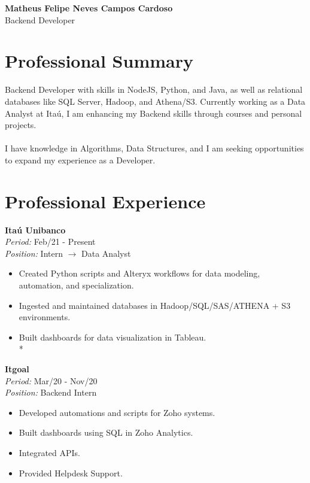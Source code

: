\documentclass[a4paper,10pt]{article}
\begin{document}
\begin{center}
    \textbf{\LARGE Matheus Felipe Neves Campos Cardoso} \\
    Backend Developer 
\end{center}

\begin{minipage}[t]{0.60\textwidth}
    \section*{\faUser \space Professional Summary}
    Backend Developer with skills in NodeJS, Python, and Java, as well as relational databases like SQL Server, Hadoop, and Athena/S3. Currently working as a Data Analyst at Itaú, I am enhancing my Backend skills through courses and personal projects.\\\\
    I have knowledge in Algorithms, Data Structures, and I am seeking opportunities to expand my experience as a Developer.

    \section*{\faBriefcase \space Professional Experience}
        \textbf{Itaú Unibanco} \\
        \textit{Period:} Feb/21 - Present \\
        \textit{Position:} Intern $\rightarrow$ Data Analyst

        \begin{itemize}[left=0pt]
            \item Created Python scripts and Alteryx workflows for data modeling, automation, and specialization.
            \item Ingested and maintained databases in Hadoop/SQL/SAS/ATHENA + S3 environments.
            \item Built dashboards for data visualization in Tableau. \\*
        \end{itemize}

        \textbf{Itgoal} \\
        \textit{Period:} Mar/20 - Nov/20 \\
        \textit{Position:} Backend Intern

        \begin{itemize}[left=0pt]
            \item Developed automations and scripts for Zoho systems.
            \item Built dashboards using SQL in Zoho Analytics.
            \item Integrated APIs.
            \item Provided Helpdesk Support.
        \end{itemize}


\end{minipage}
\end{document}
